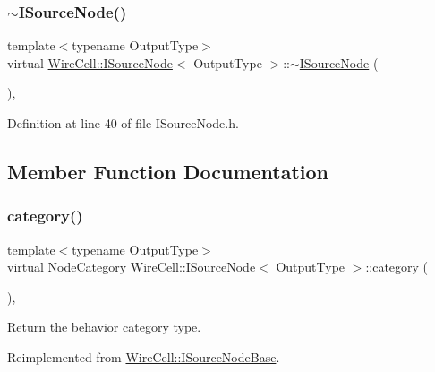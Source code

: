 \subsubsection{\texorpdfstring{$\sim$\+I\+Source\+Node()}{~ISourceNode()}}
{\footnotesize\ttfamily template$<$typename Output\+Type$>$ \\
virtual \hyperlink{class_wire_cell_1_1_i_source_node}{Wire\+Cell\+::\+I\+Source\+Node}$<$ Output\+Type $>$\+::$\sim$\hyperlink{class_wire_cell_1_1_i_source_node}{I\+Source\+Node} (\begin{DoxyParamCaption}{ }\end{DoxyParamCaption})\hspace{0.3cm}{\ttfamily [inline]}, {\ttfamily [virtual]}}



Definition at line 40 of file I\+Source\+Node.\+h.



\subsection{Member Function Documentation}
\mbox{\label{class_wire_cell_1_1_i_source_node_a1742b49fa591d01cd209ed027a7d29ba}} 
\subsubsection{\texorpdfstring{category()}{category()}}
{\footnotesize\ttfamily template$<$typename Output\+Type$>$ \\
virtual \hyperlink{class_wire_cell_1_1_i_node_a5546e64cbb70bd3ac787295cac9ac803}{Node\+Category} \hyperlink{class_wire_cell_1_1_i_source_node}{Wire\+Cell\+::\+I\+Source\+Node}$<$ Output\+Type $>$\+::category (\begin{DoxyParamCaption}{ }\end{DoxyParamCaption})\hspace{0.3cm}{\ttfamily [inline]}, {\ttfamily [virtual]}}



Return the behavior category type. 



Reimplemented from \hyperlink{class_wire_cell_1_1_i_source_node_base_adc531c3da5aa3192940e60390e683736}{Wire\+Cell\+::\+I\+Source\+Node\+Base}.



